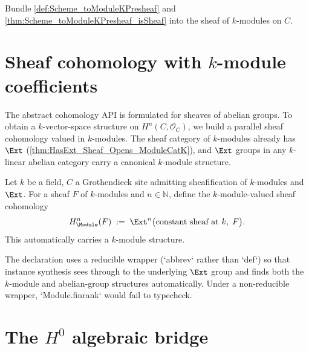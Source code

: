 \begin{definition}
  \label{def:Scheme_toModuleKSheaf}

  Bundle \cref{def:Scheme_toModuleKPresheaf} and \cref{thm:Scheme_toModuleKPresheaf_isSheaf} into the sheaf of \(k\)-modules on \(C\).
\end{definition}

\section{Sheaf cohomology with \(k\)-module coefficients}
\label{sec:HModule}

The abstract cohomology API is formulated for sheaves of abelian groups. To obtain a \(k\)-vector-space structure on \(H^n(C, \mathcal O_C)\), we build a parallel sheaf cohomology valued in \(k\)-modules. The sheaf category of \(k\)-modules already has \(\Ext\) (\cref{thm:HasExt_Sheaf_Opens_ModuleCatK}), and \(\Ext\) groups in any \(k\)-linear abelian category carry a canonical \(k\)-module structure.

\begin{definition}
  \label{def:Scheme_HModule}

  Let \(k\) be a field, \(C\) a Grothendieck site admitting sheafification of \(k\)-modules and \(\Ext\). For a sheaf \(F\) of \(k\)-modules and \(n \in \mathbb N\), define the \(k\)-module-valued sheaf cohomology
  \[
    H^n_{\Module}(F) \;:=\; \Ext^n\bigl(\text{constant sheaf at }k,\; F\bigr).
  \]
  This automatically carries a \(k\)-module structure.
\end{definition}

\begin{remark}
  The declaration uses a reducible wrapper (`abbrev` rather than `def`) so that instance synthesis sees through to the underlying \(\Ext\) group and finds both the \(k\)-module and abelian-group structures automatically. Under a non-reducible wrapper, `Module.finrank` would fail to typecheck.
\end{remark}

\section{The \(H^0\) algebraic bridge}
\label{sec:HModule_zero}

